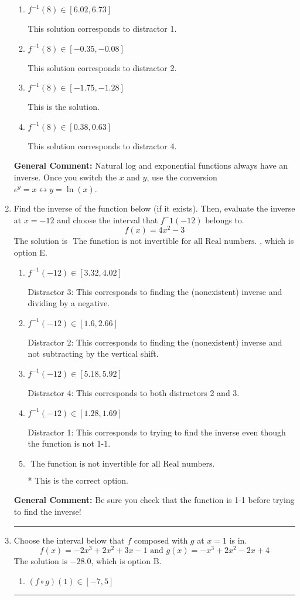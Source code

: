 \documentclass{extbook}[14pt]
\newcommand{\litem}[1]{\item #1

\rule{\textwidth}{0.4pt}}
\begin{document}
\begin{enumerate}
{\begin{enumerate}[label=\Alph*.]
 This solution corresponds to distractor 3.
\item \( f^{-1}(8) \in [6.02, 6.73] \)

 This solution corresponds to distractor 1.
\item \( f^{-1}(8) \in [-0.35, -0.08] \)

 This solution corresponds to distractor 2.
\item \( f^{-1}(8) \in [-1.75, -1.28] \)

 This is the solution.
\item \( f^{-1}(8) \in [0.38, 0.63] \)

 This solution corresponds to distractor 4.
\end{enumerate}

\textbf{General Comment:} Natural log and exponential functions always have an inverse. Once you switch the $x$ and $y$, use the conversion $ e^y = x \leftrightarrow y=\ln(x)$.
}
\litem{
Find the inverse of the function below (if it exists). Then, evaluate the inverse at $x = -12$ and choose the interval that $f^-1(-12)$ belongs to.
\[ f(x) = 4 x^2 - 3 \]The solution is \( \text{ The function is not invertible for all Real numbers. } \), which is option E.\begin{enumerate}[label=\Alph*.]
\item \( f^{-1}(-12) \in [3.32, 4.02] \)

 Distractor 3: This corresponds to finding the (nonexistent) inverse and dividing by a negative.
\item \( f^{-1}(-12) \in [1.6, 2.66] \)

 Distractor 2: This corresponds to finding the (nonexistent) inverse and not subtracting by the vertical shift.
\item \( f^{-1}(-12) \in [5.18, 5.92] \)

 Distractor 4: This corresponds to both distractors 2 and 3.
\item \( f^{-1}(-12) \in [1.28, 1.69] \)

 Distractor 1: This corresponds to trying to find the inverse even though the function is not 1-1. 
\item \( \text{ The function is not invertible for all Real numbers. } \)

* This is the correct option.
\end{enumerate}

\textbf{General Comment:} Be sure you check that the function is 1-1 before trying to find the inverse!
}
\litem{
Choose the interval below that $f$ composed with $g$ at $x=1$ is in.
\[ f(x) = -2x^{3} +2 x^{2} +3 x -1 \text{ and } g(x) = -x^{3} +2 x^{2} -2 x + 4 \]The solution is \( -28.0 \), which is option B.\begin{enumerate}[label=\Alph*.]
\item \( (f \circ g)(1) \in [-7, 5] \)


\end{enumerate}}
\end{enumerate}
\end{document}
